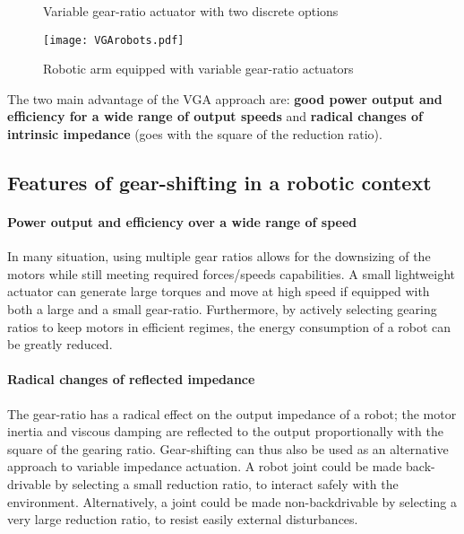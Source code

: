 \begin{figure}[htb]
        \centering
        \caption{Variable gear-ratio actuator with two discrete options}\label{fig:2s}
\end{figure}

\begin{figure}[htb]
        \centering
				\texttt{[image: VGArobots.pdf]}
        \caption{Robotic arm equipped with variable gear-ratio actuators}\label{fig:vgarobots}
\end{figure}


The two main advantage of the VGA approach are: \textbf{good power output and efficiency for a wide range of output speeds} and \textbf{radical changes of intrinsic impedance} (goes with the square of the reduction ratio). 

\subsection{Features of gear-shifting in a robotic context}

\paragraph{Power output and efficiency over a wide range of speed}
In many situation, using multiple gear ratios allows for the downsizing of the motors while still meeting required forces/speeds capabilities. A small lightweight actuator can generate large torques and move at high speed if equipped with both a large and a small gear-ratio. Furthermore, by actively selecting gearing ratios to keep motors in efficient regimes, the energy consumption of a robot can be greatly reduced. 

\paragraph{Radical changes of reflected impedance}
The gear-ratio has a radical effect on the output impedance of a robot; the motor inertia and viscous damping are reflected to the output proportionally with the square of the gearing ratio. Gear-shifting can thus also be used as an alternative approach to variable impedance actuation. A robot joint could be made back-drivable by selecting a small reduction ratio, to interact safely with the environment.  Alternatively, a joint could be made non-backdrivable by selecting a very large reduction ratio, to resist easily external disturbances.

